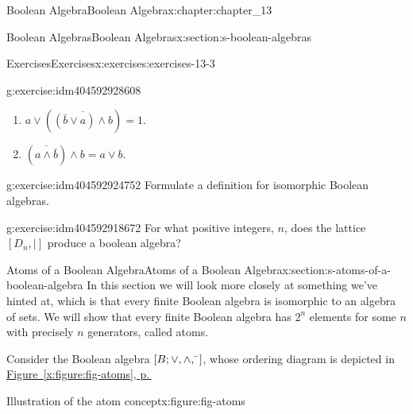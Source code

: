 \documentclass[twoside,10pt,]{book}
\newcommand{\xreffont}{\relax}
\numberwithin{equation}{section}
\begin{document}
\begin{chapterptx}{Boolean Algebra}{}{Boolean Algebra}{}{}{x:chapter:chapter_13}
\begin{sectionptx}{Boolean Algebras}{}{Boolean Algebras}{}{}{x:section:s-boolean-algebras}
\begin{exercises-subsection}{Exercises}{}{Exercises}{}{}{x:exercises:exercises-13-3}
\begin{divisionexercise}{6}{}{}{g:exercise:idm404592928608}
\begin{enumerate}[label=(\alph*)]
\item{}\(a \lor  \left(\overline{\left(\bar{b} \lor  a\right) \land  b}\right) = 1\).%
\item{}\(\left(\overline{a \land  \bar{b}}\right) \land  b = a\lor  b\).%
\end{enumerate}
%
\end{divisionexercise}%
\begin{divisionexercise}{7}{}{}{g:exercise:idm404592924752}%
Formulate a definition for isomorphic Boolean algebras.%
\end{divisionexercise}%
\begin{divisionexercise}{8}{}{}{g:exercise:idm404592918672}%
For what positive integers, \(n\), does the lattice \([D_n,\mid]\) produce a boolean algebra?%
\end{divisionexercise}%
\end{exercises-subsection}
\end{sectionptx}
%
%
\typeout{************************************************}
\typeout{************************************************}
%
\begin{sectionptx}{Atoms of a Boolean Algebra}{}{Atoms of a Boolean Algebra}{}{}{x:section:s-atoms-of-a-boolean-algebra}
In this section we will look more closely at something we've hinted at, which is that every finite Boolean algebra is isomorphic to an algebra of sets. We will show that every finite Boolean algebra has \(2^n\) elements for some \(n\) with precisely \(n\) generators, called atoms.%
\par
Consider the Boolean algebra \([B;  \lor , \land, \bar{}{\hspace{3 pt}}]\), whose ordering diagram is depicted in \hyperref[x:figure:fig-atoms]{Figure~{\xreffont\ref{x:figure:fig-atoms}}, p.\,\pageref{x:figure:fig-atoms}}%
\begin{figureptx}{Illustration of the atom concept}{x:figure:fig-atoms}{}%
\begin{image}{0.25}{0.5}{0.25}%

\end{image}
\end{figureptx}
\end{sectionptx}
\end{chapterptx}
\end{document}
